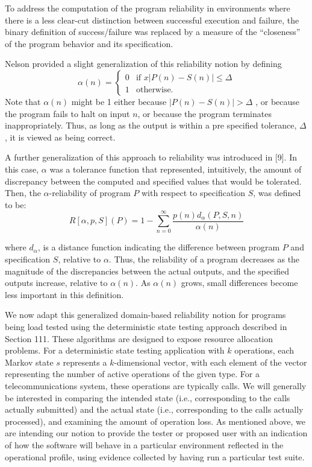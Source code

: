 \documentclass[journal, twoside]{IEEEtran}
\begin{document}
To address the computation of the program reliability in
environments where there is a less clear-cut distinction between successful execution and failure, the binary definition of
success/failure was replaced by a measure of the “closeness”
of the program behavior and its specification. 

Nelson provided a slight generalization of this reliability
notion by defining
\begin{equation*}
    \alpha(n)=
    \begin{cases}
    0   & \text{if } x|P(n) - S(n) |\leq \Delta\\
    1    & \text{otherwise}.
\end{cases}
\end{equation*}
Note that $\alpha(n)$ might be 1 either because $|P(n) - S(n) | > \Delta$  ,
or because the program fails to halt on input $n$, or because the
program terminates inappropriately. Thus, as long as the output is within a pre specified tolerance, $\Delta$, it is viewed as being
correct. 

A further generalization of this approach to reliability was
introduced in [9]. In this case, $\alpha$ was a tolerance function that
represented, intuitively, the amount of discrepancy between the
computed and specified values that would be tolerated. Then,
the $\alpha$-reliability of program $P$ with respect to specification $S$,
was defined to be: 
\begin{equation*}
    R[\alpha,p,S](P)=1-\sum_{n=0}^{\infty} \frac{p(n) d_\alpha (P,S,n)}{\alpha(n)}
\end{equation*}

where $d_\alpha$,  is a distance function indicating the difference between program $P$ and specification $S$, relative to $\alpha$. Thus, the
reliability of a program decreases as the magnitude of the discrepancies between the actual outputs, and the specified outputs increase, relative to $\alpha(n)$. As $\alpha(n)$ grows, small differences become less important in this definition.

We now adapt this generalized domain-based reliability notion for programs being load tested using the deterministic
state testing approach described in Section 111. These algorithms are designed to expose resource allocation problems.
For a deterministic state testing application with $k$ operations,
each Markov state $s$ represents a $k$-dimensional vector, with
each element of the vector representing the number of active
operations of the given type. For a telecommunications system,
these operations are typically calls. We will generally be interested in comparing the intended state (i.e., corresponding to
the calls actually submitted) and the actual state (i.e., corresponding to the calls actually processed), and examining the
amount of operation loss. As mentioned above, we are intending our notion to provide the tester or proposed user with an
indication of how the software will behave in a particular environment reflected in the operational profile, using evidence
collected by having run a particular test suite. 
\end{document}
